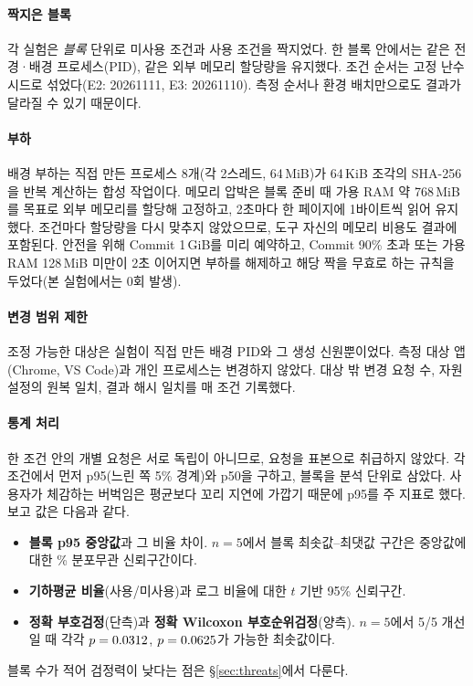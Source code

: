 \documentclass[11pt]{article}
\begin{document}
\paragraph{짝지은 블록}
각 실험은 \emph{블록} 단위로 미사용 조건과 사용 조건을 짝지었다. 한 블록 안에서는 같은 전경·배경 프로세스(PID), 같은 외부 메모리 할당량을 유지했다. 조건 순서는 고정 난수 시드로 섞었다(E2: 20261111, E3: 20261110). 측정 순서나 환경 배치만으로도 결과가 달라질 수 있기 때문이다.

\paragraph{부하}
배경 부하는 직접 만든 프로세스 8개(각 2스레드, 64\,MiB)가 64\,KiB 조각의 SHA-256을 반복 계산하는 합성 작업이다. 메모리 압박은 블록 준비 때 가용 RAM 약 768\,MiB를 목표로 외부 메모리를 할당해 고정하고, 2초마다 한 페이지에 1바이트씩 읽어 유지했다. 조건마다 할당량을 다시 맞추지 않았으므로, 도구 자신의 메모리 비용도 결과에 포함된다. 안전을 위해 Commit 1\,GiB를 미리 예약하고, Commit 90\% 초과 또는 가용 RAM 128\,MiB 미만이 2초 이어지면 부하를 해제하고 해당 짝을 무효로 하는 규칙을 두었다(본 실험에서는 0회 발생).

\paragraph{변경 범위 제한}
조정 가능한 대상은 실험이 직접 만든 배경 PID와 그 생성 신원뿐이었다. 측정 대상 앱(Chrome, VS Code)과 개인 프로세스는 변경하지 않았다. 대상 밖 변경 요청 수, 자원 설정의 원복 일치, 결과 해시 일치를 매 조건 기록했다.

\paragraph{통계 처리}
한 조건 안의 개별 요청은 서로 독립이 아니므로, 요청을 표본으로 취급하지 않았다. 각 조건에서 먼저 p95(느린 쪽 5\% 경계)와 p50을 구하고, 블록을 분석 단위로 삼았다. 사용자가 체감하는 버벅임은 평균보다 꼬리 지연에 가깝기 때문에 p95를 주 지표로 했다. 보고 값은 다음과 같다.
\begin{itemize}
  \item \textbf{블록 p95 중앙값}과 그 비율 차이. $n=5$에서 블록 최솟값--최댓값 구간은 중앙값에 대한 \numCiLevel\% 분포무관 신뢰구간이다.
  \item \textbf{기하평균 비율}(사용/미사용)과 로그 비율에 대한 $t$ 기반 95\% 신뢰구간.
  \item \textbf{정확 부호검정}(단측)과 \textbf{정확 Wilcoxon 부호순위검정}(양측). $n=5$에서 5/5 개선일 때 각각 $p=0.0312$, $p=0.0625$가 가능한 최솟값이다.
\end{itemize}
블록 수가 적어 검정력이 낮다는 점은 \S\ref{sec:threats}에서 다룬다.
\end{document}
